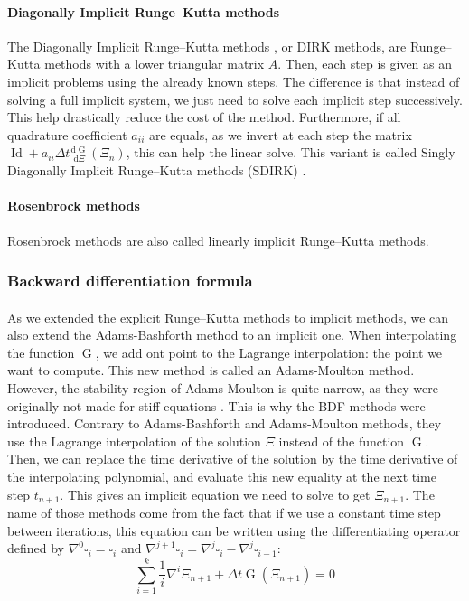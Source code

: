         \paragraph{Diagonally Implicit Runge--Kutta methods}
        The Diagonally Implicit Runge--Kutta methods \cite{Alexander1977}, or DIRK methods, are Runge--Kutta methods with a lower triangular matrix $A$.
        Then, each step is given as an implicit problems using the already known steps.
        The difference is that instead of solving a full implicit system, we just need to solve each implicit step successively.
        This help drastically reduce the cost of the method.
        Furthermore, if all quadrature coefficient $a_{ii}$ are equals, as we invert at each step the matrix $\operatorname{Id} + a_{ii} \Delta t \frac{\mathrm{d} \operatorname{G}}{\mathrm{d} \Xi}\left(\Xi_n\right)$, this can help the linear solve.
        This variant is called Singly Diagonally Implicit Runge--Kutta methods (SDIRK) \cite{HairerWanner1996}.

        \paragraph{Rosenbrock methods}
        Rosenbrock methods are also called linearly implicit Runge--Kutta methods.


      \subsubsection{Backward differentiation formula}

        \paragraph{}
        As we extended the explicit Runge--Kutta methods to implicit methods, we can also extend the Adams-Bashforth method to an implicit one.
        When interpolating the function $\operatorname{G}$, we add ont point to the Lagrange interpolation: the point we want to compute.
        This new method is called an Adams-Moulton method.
        However, the stability region of Adams-Moulton is quite narrow, as they were originally not made for stiff equations \cite{Iserles2008}.
        This is why the BDF methods were introduced.
        Contrary to Adams-Bashforth and Adams-Moulton methods, they use the Lagrange interpolation of the solution $\Xi$ instead of the function $\operatorname{G}$.
        Then, we can replace the time derivative of the solution by the time derivative of the interpolating polynomial, and evaluate this new equality at the next time step $t_{n+1}$.
        This gives an implicit equation we need to solve to get $\Xi_{n+1}$.
        The name of those methods come from the fact that if we use a constant time step between iterations, this equation can be written using the differentiating operator defined by $\nabla^0 \square_i = \square_i$ and $\nabla^{j+1} \square_i = \nabla^j \square_i - \nabla^j \square_{i-1}$:
        \begin{equation}
          \sum_{i=1}^k \frac{1}{i} \nabla^i \Xi_{n+1} + \Delta t \operatorname{G}\left(\Xi_{n+1}\right) = 0
        \end{equation}

